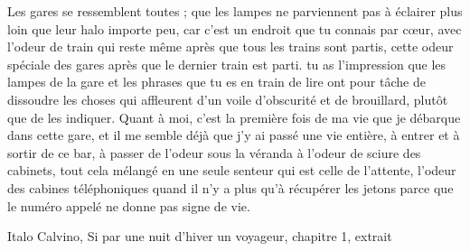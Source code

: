 \documentclass[12pt]{article}
\begin{document}
Les gares se ressemblent toutes ; que les lampes ne parviennent pas à éclairer plus loin que leur halo importe peu, car c’est un endroit que tu connais par cœur, avec l’odeur de train qui reste même après que tous les trains sont partis, cette odeur spéciale des gares après que le dernier train est parti. tu as l’impression que les lampes de la gare et les phrases que tu es en train de lire ont pour tâche de dissoudre les choses qui affleurent d’un voile d’obscurité et de brouillard, plutôt que de les indiquer. Quant à moi, c’est la première fois de ma vie que je débarque dans cette gare, et il me semble déjà que j’y ai passé une vie entière, à entrer et à sortir de ce bar, à passer de l’odeur sous la véranda à l’odeur de sciure des cabinets, tout cela mélangé en une seule senteur qui est celle de l’attente, l’odeur des cabines téléphoniques quand il n’y a plus qu’à récupérer les jetons parce que le numéro appelé ne donne pas signe de vie.

Italo Calvino, Si par une nuit d'hiver un voyageur, chapitre 1, extrait
\end{document}

